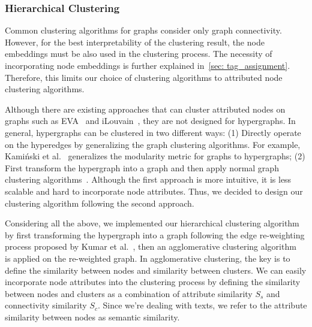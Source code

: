 \subsubsection{Hierarchical Clustering}\label{sec: clustering}
Common clustering algorithms for graphs consider only graph connectivity.
However, for the best interpretability of the clustering result, the node embeddings must be also used in the clustering process.
The necessity of incorporating node embeddings is further explained in~\autoref{sec: tag_assignment}.
Therefore, this limits our choice of clustering algorithms to attributed node clustering algorithms.

Although there are existing approaches that can cluster attributed nodes on graphs such as EVA~\cite{citraro2020eva} and iLouvain~\cite{combe2015louvain}, they are not designed for hypergraphs.
In general, hypergraphs can be clustered in two different ways: 
(1) Directly operate on the hyperedges by generalizing the graph clustering algorithms.
For example, Kamiński et al.~\cite{kaminski2021hgraphcommunity} generalizes the modularity metric for graphs to hypergraphs; 
(2) First transform the hypergraph into a graph and then apply normal graph clustering algorithms~\cite{kumar2020new}.
Although the first approach is more intuitive, it is less scalable and hard to incorporate node attributes.
Thus, we decided to design our clustering algorithm following the second approach.

Considering all the above, we implemented our hierarchical clustering algorithm by first transforming the hypergraph into a graph following the edge re-weighting process proposed by Kumar et al.~\cite{kumar2020new},
then an agglomerative clustering algorithm~\cite{steinbach2000doccluster} is applied on the re-weighted graph.
In agglomerative clustering, the key is to define the similarity between nodes and similarity between clusters.
We can easily incorporate node attributes into the clustering process by defining the similarity between nodes and clusters as a combination of attribute similarity $S_s$ and connectivity similarity $S_c$.
Since we're dealing with texts, we refer to the attribute similarity between nodes as semantic similarity. 

